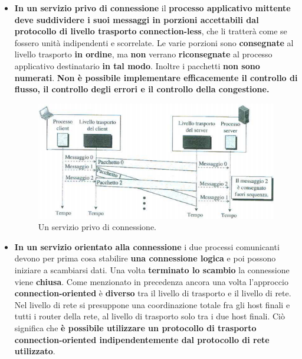 \documentclass[11pt,a4paper,oneside]{book}
\theoremstyle{definition}
\begin{document}
\begin{itemize}
	\item \textbf{In un servizio privo di connessione} il \textbf{processo applicativo mittente  deve suddividere i suoi messaggi in porzioni accettabili dal protocollo di livello trasporto} \textbf{connection-less}, che li tratterà come se fossero unità indipendenti e scorrelate. Le varie porzioni sono \textbf{consegnate} al livello trasporto \textbf{in ordine}, ma \textbf{non} verrano \textbf{riconsegnate} al processo applicativo destinatario \textbf{in tal modo}. Inoltre i pacchetti \textbf{non sono numerati}. \textbf{Non è possibile implementare efficacemente il controllo di flusso, il controllo degli errori e il controllo della congestione.}
	      \begin{figure}[!h]
		      \includegraphics[scale=0.5]{Immagini/Connection_less.png}
		      \centering
		      \caption{Un servizio privo di connessione.}
	      \end{figure}
	\item \textbf{In un servizio orientato alla connessione} i due processi comunicanti devono per prima cosa stabilire \textbf{una connessione logica} e poi possono iniziare a scambiarsi dati. Una volta \textbf{terminato lo scambio} la connessione viene \textbf{chiusa}. Come menzionato in precedenza ancora una volta l'approccio \textbf{connection-oriented} è \textbf{diverso} tra il livello di trasporto e il livello di rete. Nel livello di rete si presuppone una coordinazione totale fra gli host finali e tutti i router della rete, al livello di trasporto solo tra i due host finali. Ciò significa che \textbf{è possibile utilizzare un protocollo di trasporto connection-oriented indipendentemente dal protocollo di rete utilizzato}.
\end{itemize}

\pagebreak
\end{document}
